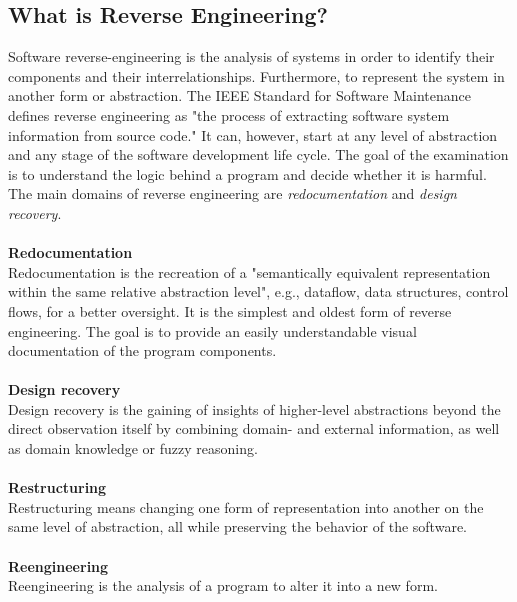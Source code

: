 \documentclass[seminar]{plai}
\begin{document}
\subsection{What is Reverse Engineering?}
\label{sec:reverse-engineering-background}
Software reverse-engineering is the analysis of systems in order to identify their components and their interrelationships. Furthermore, to represent the system in another form or abstraction.\cite{reverse-engineering-design-recovery-taxonomy}
The IEEE Standard for Software Maintenance defines reverse engineering as "the process of extracting software system information from source code."\cite{ieeeStandard-for-SW-maintenance}
It can, however, start at any level of abstraction and any stage of the software development life cycle. The goal of the examination is to understand the logic behind a program and decide whether it is harmful. The main domains of reverse engineering are \textit{redocumentation} and \textit{design recovery}.
\\\\
\textbf{Redocumentation}\\
Redocumentation is the recreation of a "semantically equivalent representation within the same relative abstraction level"\cite[p.15]{reverse-engineering-design-recovery-taxonomy}, e.g., dataflow, data structures, control flows, for a better oversight.
It is the simplest and oldest form of reverse engineering. The goal is to provide an easily understandable visual documentation of the program components.\cite{reverse-engineering-design-recovery-taxonomy}
\\\\
\textbf{Design recovery}\\
Design recovery is the gaining of insights of higher-level abstractions beyond the direct observation itself by combining domain- and external information, as well as domain knowledge or fuzzy reasoning.\cite{reverse-engineering-design-recovery-taxonomy}
\\\\
\textbf{Restructuring}\\
Restructuring means changing one form of representation into another on the same level of abstraction, all while preserving the behavior of the software.\cite{reverse-engineering-design-recovery-taxonomy}
\\\\
\textbf{Reengineering}\\
Reengineering is the analysis of a program to alter it into a new form.
\end{document}
